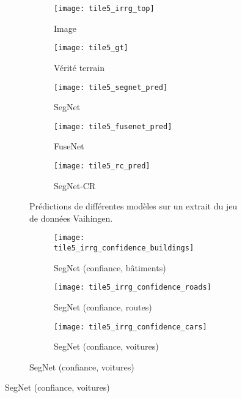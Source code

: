 \begin{figure}[!tb]
	\begin{subfigure}{\textwidth}
    	\captionsetup[subfigure]{singlelinecheck=off,justification=centering}
  		\captionsetup[subfigure]{labelformat=empty}
    	\begin{subfigure}{0.19\textwidth}
        	\texttt{[image: tile5\_irrg\_top]}
      		\caption*{Image }
        \end{subfigure}
        \begin{subfigure}{0.19\textwidth}
        	\texttt{[image: tile5\_gt]}
        	\caption*{Vérité terrain}
        \end{subfigure}
        \begin{subfigure}{0.19\textwidth}
        	\texttt{[image: tile5\_segnet\_pred]}
        	\caption*{SegNet}
        \end{subfigure}
        \begin{subfigure}{0.19\textwidth}
        	\texttt{[image: tile5\_fusenet\_pred]}
        	\caption*{FuseNet}
        \end{subfigure}
        \begin{subfigure}{0.19\textwidth}
        	\texttt{[image: tile5\_rc\_pred]}
        	\caption*{SegNet-CR}
        \end{subfigure}
        \caption{Prédictions de différentes modèles sur un extrait du jeu de données  Vaihingen.}
        \label{fig:fusion_exemple1}
    \end{subfigure}
    	\begin{subfigure}{\textwidth}
    	\captionsetup[subfigure]{singlelinecheck=off,justification=centering}
  		\captionsetup[subfigure]{labelformat=empty}
    	\begin{subfigure}{0.19\textwidth}
        	\texttt{[image: tile5\_irrg\_confidence\_buildings]}
      		\caption*{SegNet  (confiance, bâtiments)}
        \end{subfigure}
        \begin{subfigure}{0.19\textwidth}
        	\texttt{[image: tile5\_irrg\_confidence\_roads]}
        	\caption*{SegNet  (confiance, routes)}
        \end{subfigure}
        \begin{subfigure}{0.19\textwidth}
        	\texttt{[image: tile5\_irrg\_confidence\_cars]}
        	\caption*{SegNet  (confiance, voitures)}

\end{subfigure}
\end{subfigure}
\end{figure}
